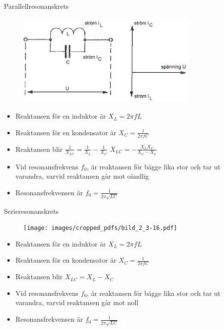 \documentclass{beamer}
\begin{document}
\begin{frame}{Parallellresonanskrets}

\begin{figure}[h]
\includegraphics[width=0.8\textwidth]{images/cropped_pdfs/bild_2_3-15.pdf}
\end{figure}

\begin{itemize}
  \item Reaktansen för en induktor är $X_L = 2\pi f L$
  \item Reaktansen för en kondensator är $X_C = \frac{1}{2\pi f C}$
  \item Reaktansen blir $\frac{1}{X_{LC}} = \frac{1}{X_L} - \frac{1}{X_C}$ $X_{LC}=-\frac{X_LX_C}{X_C-X_L}$
  \item Vid resonansfrekvens $f_0$, är reaktansen för bägge lika stor och tar ut varandra, varvid reaktansen går mot oändlig
  \item Resonansfrekvensen är $f_0 = \frac{1}{2\pi\sqrt{LC}}$
  \end{itemize}
\end{frame}

\begin{frame}{Serieresonanskrets}

\begin{figure}[h]
\texttt{[image: images/cropped\_pdfs/bild\_2\_3-16.pdf]}
\end{figure}

\begin{itemize}
  \item Reaktansen för en induktor är $X_L = 2\pi f L$
  \item Reaktansen för en kondensator är $X_C = \frac{1}{2\pi f C}$
  \item Reaktansen blir $X_{LC} = X_L - X_C$
  \item Vid resonansfrekvens $f_0$, är reaktansen för bägge lika stor och tar ut varandra, varvid reaktansen går mot noll
  \item Resonansfrekvensen är $f_0 = \frac{1}{2\pi\sqrt{LC}}$
  \end{itemize}
\end{frame}
\end{document}
